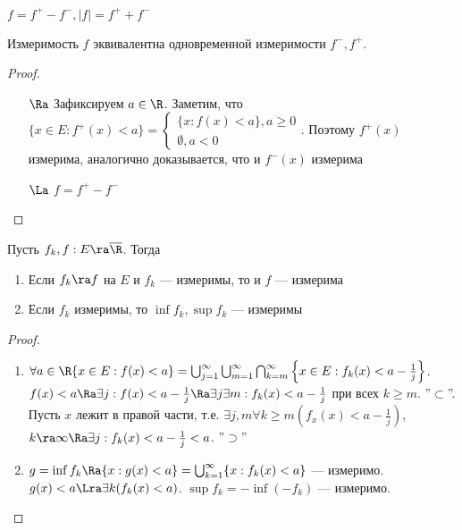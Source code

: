 \begin{note}
    \(f = f^+ - f^-, |f| = f^+ + f^-\)
\end{note}

\begin{corollary}
    Измеримость \(f\) эквивалентна одновременной измеримости \(f^-, f^+\).
\end{corollary}
\begin{proof}\indent
    \begin{enumerate}
        \item[\(\Ra\)] Зафиксируем \(a \in \R\). Заметим, что \(\{x \in E: f^+(x) < a\} = \left\{\begin{array}{l}
            \{x : f(x) < a\}, a \ge 0 \\
            \emptyset,  a < 0
        \end{array}\right.\). Поэтому \(f^+(x)\) измерима, аналогично доказывается, что и \(f^-(x)\) измерима
        \item[\(\La\)] \(f = f^+ - f^-\)
    \end{enumerate}
\end{proof}

\begin{theorem}
    Пусть \(f_k, f: E \ra \overline{\R}\). Тогда
    \begin{enumerate}
        \item Если \(f_k \ra f\) на \(E\) и \(f_k\) --- измеримы, то и \(f\) --- измерима
        \item Если \(f_k\) измеримы, то \(\inf f_k, \sup f_k\) --- измеримы
    \end{enumerate}
\end{theorem}
\begin{proof}\indent
    \begin{enumerate}
        \item \(\forall a \in \R \{x\in E: f(x) < a\} = \bigcup_{j = 1}^\infty\bigcup_{m = 1}^\infty \bigcap_{k = m}^\infty \left\{x \in E: f_k(x) < a - \frac{1}{j}\right\}\). \(f(x) < a \Ra \exists j : f(x) < a - \frac{1}{j} \Ra  \exists j \exists m: f_k(x) < a - \frac{1}{j}\) при всех \(k \ge m\). ''\(\subset\)''. Пусть \(x\) лежит в правой части, т.е. \(\exists j, m \forall k \ge m (f_x(x) < a - \frac{1}{j})\), \(k \ra \infty \Ra \exists j: f_k(x) < a - \frac{1}{j} < a\). ''\(\supset\)''
        \item \(g = \inf f_k \Ra \{x : g(x) < a\} = \bigcup_{k = 1}^\infty \{x : f_k(x) < a\}\) --- измеримо. \(g(x) < a \Lra \exists k (f_k(x) < a)\). \(\sup f_k = -\inf(-f_k)\) --- измеримо.
    \end{enumerate}
\end{proof}

